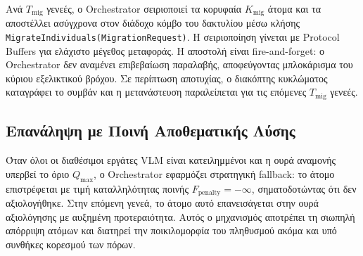 Ανά $T_{\text{mig}}$ γενεές, ο Orchestrator σειριοποιεί τα κορυφαία $K_{\text{mig}}$ άτομα και τα αποστέλλει ασύγχρονα στον διάδοχο κόμβο του δακτυλίου μέσω κλήσης \texttt{MigrateIndividuals(MigrationRequest)}. Η σειριοποίηση γίνεται με Protocol Buffers για ελάχιστο μέγεθος μεταφοράς. Η αποστολή είναι fire-and-forget: ο Orchestrator δεν αναμένει επιβεβαίωση παραλαβής, αποφεύγοντας μπλοκάρισμα του κύριου εξελικτικού βρόχου. Σε περίπτωση αποτυχίας, ο διακόπτης κυκλώματος καταγράφει το συμβάν και η μετανάστευση παραλείπεται για τις επόμενες $T_{\text{mig}}$ γενεές.

\subsection{Επανάληψη με Ποινή Αποθεματικής Λύσης}
\label{subsec:impl_retry_fallback}

Όταν όλοι οι διαθέσιμοι εργάτες VLM είναι κατειλημμένοι και η ουρά αναμονής υπερβεί το όριο $Q_{\max}$, ο Orchestrator εφαρμόζει στρατηγική fallback: το άτομο επιστρέφεται με τιμή καταλληλότητας ποινής $F_{\text{penalty}} = -\infty$, σηματοδοτώντας ότι δεν αξιολογήθηκε. Στην επόμενη γενεά, το άτομο αυτό επανεισάγεται στην ουρά αξιολόγησης με αυξημένη προτεραιότητα. Αυτός ο μηχανισμός αποτρέπει τη σιωπηλή απόρριψη ατόμων και διατηρεί την ποικιλομορφία του πληθυσμού ακόμα και υπό συνθήκες κορεσμού των πόρων.

